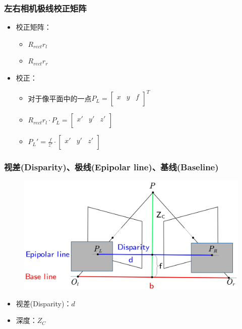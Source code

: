 \documentclass[aspectratio=43]{beamer}
\begin{document}
		\begin{frame}
		\frametitle{左右相机极线校正矩阵}
		\begin{itemize}
			\item 校正矩阵：
			\begin{itemize}
				\item $R_{rect}r_l$
				\item $R_{rect}r_r$
			\end{itemize}
			\item 校正：
			\begin{itemize}
				\item 对于像平面中的一点$P_L=\left[ \begin{matrix}
					x&		y&		f\\
				\end{matrix} \right] ^T$
			\vspace{0.2em}
				\item $R_{rect}r_l\cdot P_L=\left[ \begin{matrix}
					x'&		y'&		z'\\
				\end{matrix} \right] $
			\vspace{0.2em}
				\item $P_L'=\frac{f}{z'}\cdot \left[ \begin{matrix}
					x'&		y'&		z'\\
				\end{matrix} \right] $
			\end{itemize}			
		\end{itemize}
		\end{frame}	
	
		\begin{frame}
		\frametitle{视差(Disparity)、极线(Epipolar line)、基线(Baseline)}
		\begin{figure}
		\begin{center}
			\includegraphics[scale=0.6]{双目相机-极线校正1}
		\end{center}
		\end{figure}
		\begin{itemize}
			\item 视差(Disparity)：$d$
			\item 深度：$Z_C$
		\end{itemize}
		\end{frame}
	
\end{document}
